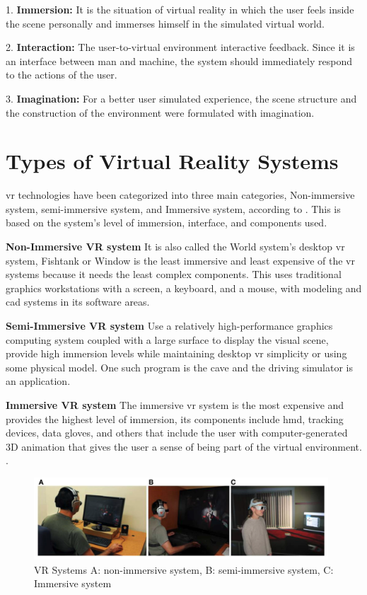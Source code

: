 1. \textbf{Immersion:} It is the situation of virtual reality in which the user feels inside the scene personally and immerses himself in the simulated virtual world.



2. \textbf{Interaction:} The user-to-virtual environment interactive feedback. Since it is an interface between man and machine, the system should immediately respond to the actions of the user.




3. \textbf{Imagination:} For a better user simulated experience, the scene structure and the construction of the environment were formulated with imagination.

\section{Types of Virtual Reality Systems} \acrshort{vr} technologies have been categorized into three main categories, Non-immersive system, semi-immersive system, and Immersive system, according to \cite{Bamodu2013VirtualComponents}. This is based on the system's level of immersion, interface, and components used.  

\textbf{Non-Immersive VR system}
It is also called the World system's desktop \acrshort{vr} system, Fishtank or Window is the least immersive and least expensive of the \acrshort{vr} systems because it needs the least complex components. This uses traditional graphics workstations with a screen, a keyboard, and a mouse, with modeling and \acrfull{cad} systems in its software areas.  

\textbf{Semi-Immersive VR system}
Use a relatively high-performance graphics computing system coupled with a large surface to display the visual scene, provide high immersion levels while maintaining desktop \acrshort{vr} simplicity or using some physical model. One such program is the \acrfull{cave} and the driving simulator is an application. 

\textbf{Immersive VR system}
 The immersive \acrshort{vr} system is the most expensive and provides the highest level of immersion, its components include \acrfull{hmd}, tracking devices, data gloves, and others that include the user with computer-generated 3D animation that gives the user a sense of being part of the virtual environment. \citep{Bamodu2013VirtualComponents, Baus2014MovingReview}.

\begin{figure}[ht]
    \centering
    \includegraphics[width=0.98\textwidth]{images/vrsystem.png}
    \caption{VR Systems A: non-immersive system, B: semi-immersive system, C: Immersive system \citep{Baus2014MovingReview}}
    \label{fig:vrsys}
\end{figure}


